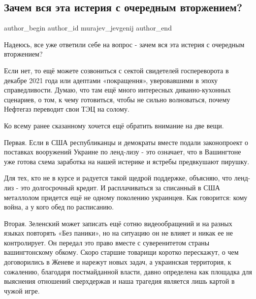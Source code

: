  
 
 
 
 
 
\subsection{Зачем вся эта истерия с очередным вторжением?}
\label{sec:21_01_2022.fb.murajev_jevgenij.1.isteria_vtorzhenie}
 
\ifcmt
 author_begin
   author_id murajev_jevgenij
 author_end
\fi

Надеюсь, все уже ответили себе на вопрос - зачем вся эта истерия с очередным
вторжением? 

Если нет, то ещё можете созвониться с сектой свидетелей госпереворота в декабре
2021 года или адептами «покращення», уверовавшими в эпоху справедливости.
Думаю, что там ещё много интересных диванно-кухонных сценариев, о том, к чему
готовиться, чтобы не сильно волноваться, почему Нефтегаз переводит свои ТЭЦ на
солому. 


Ко всему ранее сказанному хочется ещё обратить внимание на две вещи. 

Первая. Если в США республиканцы и демократы вместе подали законопроект о
поставках вооружений Украине по ленд-лизу - это означает, что в Вашингтоне уже
готова схема заработка на нашей истерике и ястребы предвкушают пирушку. 

Для тех, кто не в курсе и радуется такой щедрой поддержке, объясняю, что
ленд-лиз - это долгосрочный кредит. И расплачиваться за списанный в США
металлолом придется ещё не одному поколению украинцев. Как говорится: кому
война, а у кого обед по расписанию. 

Вторая. Зеленский может записать ещё сотню видеообращений и на разных языках
повторять «Без паники», но на ситуацию он не влияет и никак ее не контролирует.
Он передал это право вместе с суверенитетом страны вашингтонскому обкому. Скоро
старшие товарищи коротко перескажут, о чем договорились в Женеве и нарежут
новых задач, а украинская территория, к сожалению, благодаря постмайданной
власти,  давно  определена как площадка для выяснения отношений сверхдержав и
наша трагедия является лишь картой в чужой игре.


